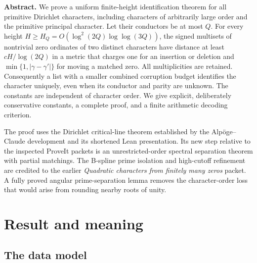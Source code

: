 \documentclass[11pt,letterpaper]{article}
\theoremstyle{definition}\newtheorem{definition}[theorem]{Definition}
\theoremstyle{remark}\newtheorem{remark}[theorem]{Remark}
\begin{document}
\thispagestyle{plain}
\vspace{.35cm}
\vspace{.15cm}
\vspace{.35cm}

\noindent\textbf{Abstract.}
We prove a uniform finite-height identification theorem for all primitive
Dirichlet characters, including characters of arbitrarily large order and
the primitive principal character. Let their conductors be at most $Q$.
For every height
$H\ge H_Q=O(\log^2(2Q)\log\log(3Q))$, the signed multisets of nontrivial
zero ordinates of two distinct characters have distance at least
$cH/\log(2Q)$ in a metric that charges one for an insertion or deletion
and $\min\{1,|\gamma-\gamma'|\}$ for moving a matched zero.
All multiplicities are retained. Consequently a list with a smaller
combined corruption budget identifies the character uniquely, even when
its conductor and parity are unknown. The constants are independent of
character order. We give explicit, deliberately conservative constants,
a complete proof, and a finite arithmetic decoding criterion.

The proof uses the Dirichlet critical-line theorem established by the
Alp\"oge--Claude development and its shortened Lean presentation. Its new
step relative to the inspected ProveIt packets is an unrestricted-order
spectral separation theorem with partial matchings. The B-spline prime
isolation and high-cutoff refinement are credited to the earlier
\emph{Quadratic characters from finitely many zeros} packet. A fully
proved angular prime-separation lemma removes the character-order loss
that would arise from rounding nearby roots of unity.

\setcounter{tocdepth}{1}
\tableofcontents
\clearpage

\section{Result and meaning}

\subsection{The data model}
\end{document}
